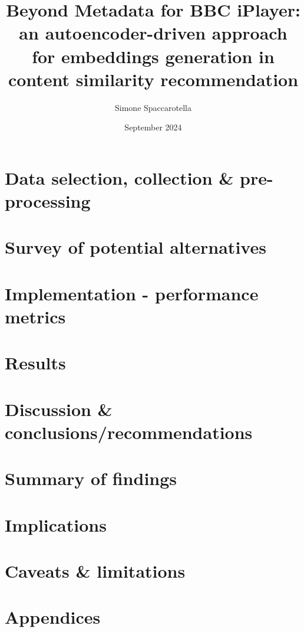 \documentclass[12pt,a4paper]{article}
\begin{document}
\title{Beyond Metadata for BBC iPlayer:\\an autoencoder-driven approach for embeddings generation in content similarity recommendation}
\author{Simone Spaccarotella}
\date{September 2024}

\maketitle
\tableofcontents









\section{Data selection, collection \& pre-processing}

\section{Survey of potential alternatives}

\section{Implementation - performance metrics}

\section{Results}

\section{Discussion \& conclusions/recommendations}

\section{Summary of findings}

\section{Implications}

\section{Caveats \& limitations}

\section{Appendices}



\end{document}
